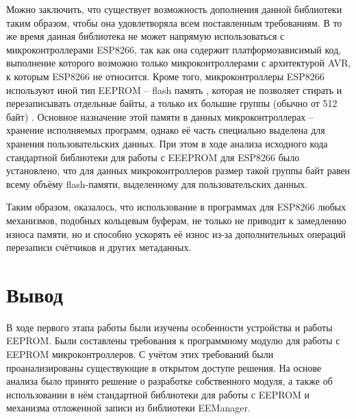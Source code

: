 Можно заключить, что существует возможность дополнения данной библиотеки таким образом, чтобы она удовлетворяла всем поставленным требованиям.
В то же время данная библиотека не может напрямую использоваться с микроконтроллерами ESP8266, так как она содержит платформозависимый код, выполнение которого возможно только микроконтроллерами с архитектурой AVR, к которым ESP8266 не относится.
Кроме того, микроконтроллеры ESP8266 используют иной тип EEPROM -- flash память \cite{web:esp-eeprom-src, web:usage-of-esp-eeprom}, которая не позволяет стирать и перезаписывать отдельные байты, а только их большие группы (обычно от 512 байт) \cite{incollection:flash-memory}.
Основное назначение этой памяти в данных микроконтроллерах -- хранение исполняемых программ, однако её часть специально выделена для хранения пользовательских данных.
При этом в ходе анализа исходного кода стандартной библиотеки \cite{web:esp-eeprom-src} для работы с EEEPROM для ESP8266 было установлено, что для данных микроконтроллеров размер такой группы байт равен всему объёму flash-памяти, выделенному для пользовательских данных.

Таким образом, оказалось, что использование в программах для ESP8266 любых механизмов, подобных кольцевым буферам, не только не приводит к замедлению износа памяти, но и способно ускорять её износ из-за дополнительных операций перезаписи счётчиков и других метаданных.

\section{Вывод}

В ходе первого этапа работы были изучены особенности устройства и работы EEPROM.
Были составлены требования к программному модулю для работы с EEPROM микроконтроллеров.
С учётом этих требований были проанализированы существующие в открытом доступе решения.
На основе анализа было принято решение о разработке собственного модуля, а также об использовании в нём стандартной библиотеки для работы с EEPROM и механизма отложенной записи из библиотеки EEManager.
